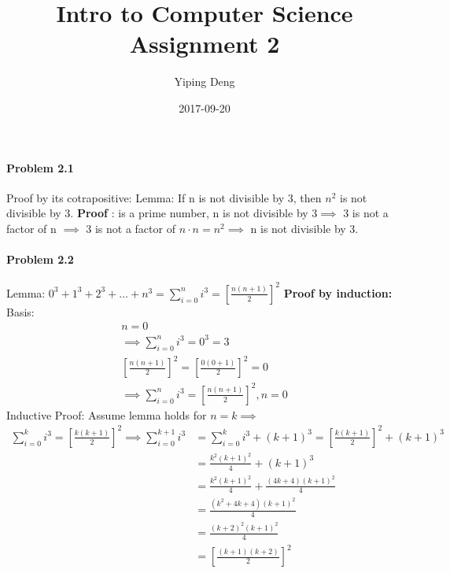\documentclass{article}
\title{Intro to Computer Science Assignment 2}
\date{2017-09-20}
\author{Yiping Deng}
\begin{document}
\maketitle
\paragraph{Problem 2.1} \hfill \break
Proof by its cotrapositive: \hfill \break
Lemma: If n is not divisible by 3, then $n^2$ is not divisible by 3. \hfill \break
\textbf{Proof} :  \hfill {} is a prime number, n is not divisible by 3$\implies $ 3 is not a factor of n $\implies $ 3 is not a factor of $ n \cdot n = n^2 \implies$ n is not divisible by 3. \hfill \break

\paragraph{Problem 2.2}
Lemma: $ 0^3 + 1^3 + 2^3 + ... + n^3 = \sum_{i=0}^{n} i^3 = [\frac{n(n + 1)}{2}]^2$ \hfill \break
\textbf{Proof by induction:} \\
Basis:
\begin{align}
 n = 0 \\
 \implies \sum_{i=0}^{n} i^3 = 0^3 = 3 \\
[\frac{n(n + 1)}{2}]^2 = [\frac{0(0 + 1)}{2}]^2 = 0 \\
\implies \sum_{i=0}^{n} i^3 = [\frac{n(n + 1)}{2}]^2, n = 0
\end{align}
\hfill \break \break
Inductive Proof: Assume lemma holds for $n = k \implies $
\begin{align}
\sum_{i=0}^{k} i^3 =  [\frac{k(k + 1)}{2}]^2 \implies
\sum_{i=0}^{k + 1} i^3
&= \sum_{i=0}^{k} i^3 + (k + 1)^3
= [\frac{k(k + 1)}{2}]^2 + (k + 1)^3
\\& = \frac{k^2(k + 1)^2}{4}+ (k + 1)^3
\\&= \frac{k^2(k + 1)^2}{4} + \frac{(4k+4)(k+1)^2}{4}
\\&= \frac{(k^2 + 4k + 4)(k+1)^2}{4}
\\&= \frac{(k +2 )^2 (k + 1)^2}{4}
\\&= [\frac{(k + 1)(k + 2)}{2}]^2
\end{align}
\end{document}
